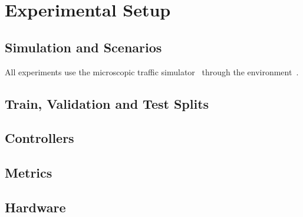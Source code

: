 \section{Experimental Setup}
\label{sec:setup}

\subsection{Simulation and Scenarios}
All experiments use the \sumo{} microscopic traffic simulator~\cite{lopez2018microscopic} through the
\sumorl{} environment~\cite{AlegreSUMORL}.


\subsection{Train, Validation and Test Splits}

\subsection{Controllers}

\subsection{Metrics}

\subsection{Hardware}
